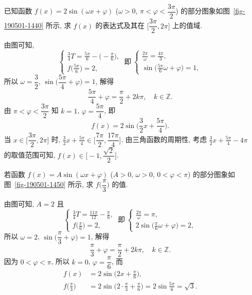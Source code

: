 \begin{example}
    已知函数 $f(x)=2\sin(\omega x+\varphi)$ ($\omega>0$, $\pi<\varphi<\dfrac{3\pi}2$) 的部分图象如图~\ref{fig-190501-1440} 所示, 求 $f(x)$ 的表达式及其在 $\Big[\dfrac{3\pi}2, 2\pi\Big]$ 上的值域.
\end{example}
\beginsolution
    由图可知, 
    \[\left\{\!\!\begin{array}{l}
        \frac34 T= \frac{5\pi}{6}-\biggl(-\frac{\pi}{6}\biggr),\\
        f\biggl(\frac{5\pi}{6}\biggl)=2,
    \end{array}\right.\ \text{即}\ 
    \left\{\!\!\begin{array}{l}
        \frac{2\pi}\omega= \frac{4\pi}3,\\
        \sin\biggl(\frac{5\pi}{6}\omega+\varphi\biggl)= 1,
    \end{array}\right.\]
    所以 $\omega= \dfrac32$, $\sin\biggl(\dfrac{5\pi}4+ \varphi\biggr)= 1$, 解得
    \[\frac{5\pi}4+\varphi= \frac\pi2+2k\pi,\quad k\in\mathbb{Z}.\]
    由 $\pi<\varphi<\dfrac{3\pi}2$ 知 $k=1$, $\varphi= \dfrac{5\pi}4$, 即
    \[f(x)= 2\sin\biggl(\frac32 x+ \frac{5\pi}4\biggr).\]
    当 $x\in\Big[\dfrac{3\pi}2, 2\pi\Big]$ 时, $\frac32 x+ \frac{5\pi}4\in\biggl[\dfrac{7\pi}2, \dfrac{17\pi}4\biggr]$. 由三角函数的周期性, 考虑 $\frac32 x+ \frac{5\pi}4- 4\pi$ 的取值范围可知, $f(x)\in\biggl[-1,\dfrac{\sqrt2}2\biggr]$.
\endsolution

\lianxi
\begin{exercise}[s]
    若函数 $f(x)=A\sin(\omega x+\varphi)$ ($A>0$, $\omega>0$, $0<\varphi<\pi$) 的部分图象如图~\ref{fig-190501-1450} 所示, 求 $f\Big(\dfrac\pi3\Big)$ 的值.
\end{exercise}
\beginsolution
    由图可知, $A=2$ 且
    \[\left\{\!\!\begin{array}{l}
        \frac34 T= \frac{11\pi}{12}-\frac{\pi}{6},\\
        f\biggl(\frac{\pi}{6}\biggl)=2,
    \end{array}\right.\ \text{即}\ 
    \left\{\!\!\begin{array}{l}
        \frac{2\pi}\omega= \pi,\\
        2\sin\biggl(\frac{\pi}{6}\omega+\varphi\biggl)= 2,
    \end{array}\right.\]
    所以 $\omega= 2$, $\sin\biggl(\dfrac{\pi}3+ \varphi\biggr)= 1$, 解得
    \[\frac{\pi}3+\varphi= \frac\pi2+2k\pi,\quad k\in\mathbb{Z}.\]
    因为 $0<\varphi<\pi$, 所以 $k=0$, $\varphi= \dfrac{\pi}6$, 而
    \[\begin{aligned}
        f(x)&= 2\sin\biggl(2x+ \frac{\pi}6\biggr),\\
        f\biggl(\frac\pi3\biggr)&= 2\sin\biggl(2\cdot\frac\pi3+ \frac{\pi}6\biggr)
         = 2\sin\frac{5\pi}6= \sqrt3.
    \end{aligned}\]
\endsolution

